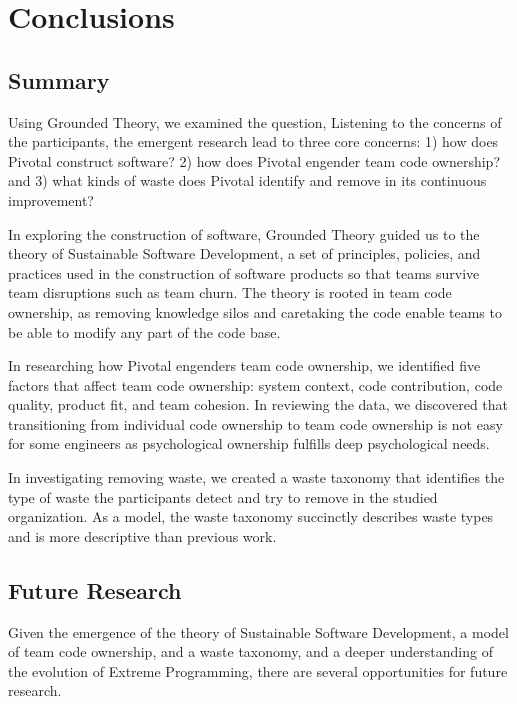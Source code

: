 

\chapter{Conclusions}
\label{ConclusionChapter}


\section{Summary}


Using Grounded Theory, we examined the question,  Listening to the concerns of the participants, the emergent research lead to three core concerns: 1) how does Pivotal construct software? 2) how does Pivotal engender team code ownership? and 3) what kinds of waste does Pivotal identify and remove in its continuous improvement? 
 
In exploring the construction of software, Grounded Theory guided us to the theory of Sustainable Software Development, a set of principles, policies, and practices used in the construction of software products so that teams survive team disruptions such as team churn. The theory is rooted in team code ownership, as removing knowledge silos and caretaking the code enable teams to be able to modify any part of the code base. 


In researching how Pivotal engenders team code ownership, we identified five factors that affect team code ownership: system context, code contribution, code quality, product fit, and team cohesion. In reviewing the data, we discovered that transitioning from individual code ownership to team code ownership is not easy for some engineers as psychological ownership fulfills deep psychological needs.


In investigating removing waste, we created a waste taxonomy that identifies the type of waste the participants detect and try to remove in the studied organization. As a model, the waste taxonomy succinctly describes waste types and is more descriptive than previous work. 


\section{Future Research}
Given the emergence of the theory of Sustainable Software Development, a model of team code ownership, and a waste taxonomy, and a deeper understanding of the evolution of Extreme Programming, there are several opportunities for future research.


